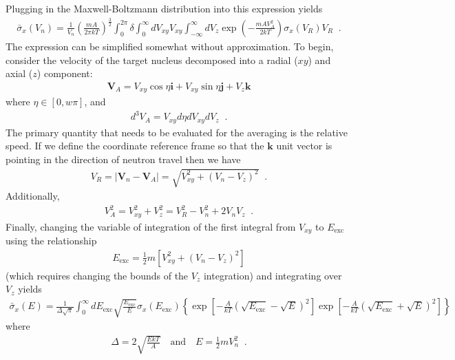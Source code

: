 \documentclass[11pt]{article}
\renewcommand\vec{\mathbf}
\begin{document}
Plugging in the Maxwell-Boltzmann distribution into this expression yields
\begin{align}
  \bar{\sigma}_x(V_n) = 
  \frac{1}{V_n} \left( \frac{mA}{2\pi k T} \right)^\frac{3}{2}
  \int_0^{2\pi} \delta \int_0^\infty dV_{xy} V_{xy} \int_{-\infty}^\infty dV_z \exp\left(-\frac{mAV_A^2}{2kT} \right) \sigma_x(V_R) V_R \;\;.
\end{align}
The expression can be simplified somewhat without approximation.  To begin, consider the velocity of the target nucleus decomposed into a radial (\(xy\)) and axial (\(z\)) component:
\begin{align}
  \vec{V}_A = V_{xy} \cos\eta \vec{i} + V_{xy} \sin\eta \vec{j} + V_z \vec{k}
\end{align}
where \(\eta \in \left[0, w\pi\right]\), and
\begin{align}
  d^3V_A = V_{xy} d\eta dV_{xy} dV_z \;\;.
\end{align}
The primary quantity that needs to be evaluated for the averaging is the relative speed.  If we define the coordinate reference frame so that the \(\vec{k}\) unit vector is pointing in the direction of neutron travel then we have
\begin{align}
  V_R = | \vec{V}_n - \vec{V}_A | = \sqrt{V_{xy}^2  + \left(V_n - V_z\right)^2} \;\;.
\end{align}
Additionally,
\begin{align}
  V_A^2 = V_{xy}^2 + V_z^2 = V_R^2 - V_n^2 + 2V_nV_z \;\;.
\end{align}
Finally, changing the variable of integration of the first integral from \(V_{xy}\) to \(E_\text{exc}\) using the relationship
\begin{align}
  E_\text{exc} = \frac{1}{2}m\left[V_{xy}^2 + (V_n - V_z)^2\right]
\end{align}
(which requires changing the bounds of the \(V_z\) integration) and integrating over \(V_z\) yields
\begin{align}\label{eq::avgMicro}
  \bar{\sigma}_x(E) = \frac{1}{\Delta\sqrt{\pi}} \int_0^\infty dE_\text{exc} \sqrt{\frac{E_\text{exc}}{E}} \sigma_x(E_\text{exc}) 
  \left\{ \exp\left[ -\frac{A}{kT}\left(\sqrt{E_\text{exc}} - \sqrt{E} \right)^2 \right] 
         \exp\left[ -\frac{A}{kT}\left(\sqrt{E_\text{exc}} + \sqrt{E} \right)^2 \right]  \right\}
\end{align}
where
\begin{align}
  \Delta = 2 \sqrt{\frac{EkT}{A}} \quad \text{and} \quad E = \frac{1}{2}mV_n^2 \;\;.
\end{align}
\end{document}
